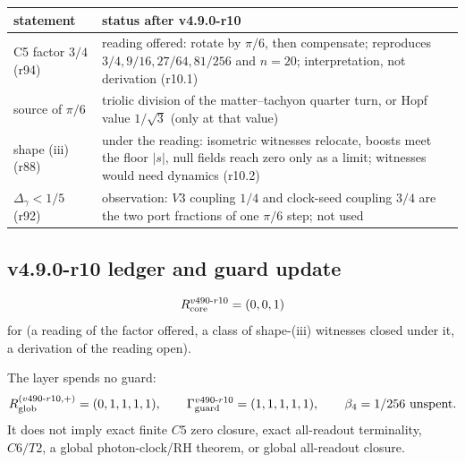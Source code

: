 \begin{center}
\small
\begin{tabular}{@{}>{\raggedright\arraybackslash}p{}>{\raggedright\arraybackslash}p{}@{}}
\toprule
statement & status after v4.9.0-r10\\
\midrule
C5 factor \(3/4\) (r94) & reading offered: rotate by \(\pi/6\), then compensate; reproduces \(3/4,9/16,27/64,81/256\) and \(n=20\); interpretation, not derivation (r10.1)\\
source of \(\pi/6\) & triolic division of the matter--tachyon quarter turn, or Hopf value \(1/\sqrt3\) (only at that value)\\
shape (iii) (r88) & under the reading: isometric witnesses relocate, boosts meet the floor \(|s|\), null fields reach zero only as a limit; witnesses would need dynamics (r10.2)\\
\(\Delta_\gamma<1/5\) (r92) & observation: \(V3\) coupling \(1/4\) and clock-seed coupling \(3/4\) are the two port fractions of one \(\pi/6\) step; not used\\
\bottomrule
\end{tabular}
\end{center}

\subsection*{v4.9.0-r10 ledger and guard update}
\label{subsec:v490-r10-ledger-guard}

\[
R_{\rm core}^{v490\text{-}r10}=(0,0,1)
\]
for (a reading of the factor offered, a class of shape-(iii) witnesses closed under it, a derivation of the reading open).

The layer spends no guard:
\[
R_{\rm glob}^{(v490\text{-}r10,+)}=(0,1,1,1,1),
\qquad
\Gamma_{\rm guard}^{v490\text{-}r10}=(1,1,1,1,1),
\qquad
\beta_4=1/256\ \text{unspent}.
\]
It does not imply exact finite \(C5\) zero closure, exact all-readout terminality,
\(C6/T2\), a global photon-clock/RH theorem, or global all-readout closure.

